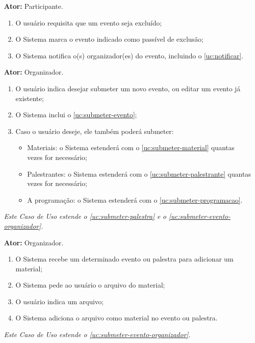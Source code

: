 \documentclass[12pt,a4paper,twoside,hyphens,english,brazil]{abntex2}
\begin{document}
{\textbf{Ator:} Participante.
\begin{enumerate}[itemsep=-1ex,topsep=-1ex]
	\item O usuário requisita que um evento seja excluído;
	\item O Sistema marca o evento indicado como passível de exclusão;
	\item O Sistema notifica o(s) organizador(es) do evento, incluindo o \ref{uc:notificar}.
\end{enumerate}

\textbf{Ator:} Organizador.
\begin{enumerate}[itemsep=-1ex,topsep=-1ex]
	\item O usuário indica desejar submeter um novo evento, ou editar um evento já existente;
	\item O Sistema inclui o \ref{uc:submeter-evento};
	\item Caso o usuário deseje, ele também poderá submeter:
		\begin{itemize}[itemsep=-1ex,topsep=-1ex]
			\item Materiais: o Sistema estenderá com o \ref{uc:submeter-material} quantas vezes for necessário;
			\item Palestrantes: o Sistema estenderá com o \ref{uc:submeter-palestrante} quantas vezes for necessário;
			\item A programação: o Sistema estenderá com o \ref{uc:submeter-programacao}.
		\end{itemize}
\end{enumerate}

\emph{Este Caso de Uso estende o \ref{uc:submeter-palestra} e o \ref{uc:submeter-evento-organizador}.}

\textbf{Ator:} Organizador.
\begin{enumerate}[itemsep=-1ex,topsep=-1ex]
	\item O Sistema recebe um determinado evento ou palestra para adicionar um material;
	\item O Sistema pede ao usuário o arquivo do material;
	\item O usuário indica um arquivo;
	\item O Sistema adiciona o arquivo como material no evento ou palestra.
\end{enumerate}

\emph{Este Caso de Uso estende o \ref{uc:submeter-evento-organizador}.}

}
\end{document}
